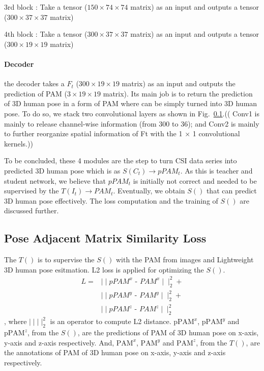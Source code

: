 \documentclass[conference]{IEEEtran}
\begin{document}
	 	3rd block : Take a tensor ($150\times74\times74$   matrix) as an input and outputs a tensor ($300\times37\times37$  matrix)
	 	
	 	4th block : Take a tensor ($300\times37\times37$   matrix) as an input and outputs a tensor ($300\times19\times19$  matrix)
	 	
	 	\paragraph{Decoder}
	 	
	 	the decoder takes a $F_t$ ($300\times19\times19$  matrix) as an input and outputs the prediction of PAM ($3\times19\times19$ matrix). Its main job is to return the prediction of 3D human pose in a form of PAM where can be simply turned into 3D human pose. To do so,	 we stack two convolutional layers as shown in Fig.~\ref{}.(( Conv1 is mainly to release channel-wise information (from 300 to 36); and Conv2 is
	 	mainly to further reorganize spatial information of Ft with the 1 × 1 convolutional kernels.))
	 	
	 	
	 	To be concluded, these 4 modules are the step to turn CSI data series into predicted 3D human pose which is as $S(C_t) \rightarrow pPAM_t$. As this is teacher and student network, we believe that $pPAM_t$ is initially not correct and needed to be supervised by the $T(I_t) \rightarrow PAM_t$. Eventually, we obtain $S()$ that can predict 3D human pose effectively. The loss computation and the training of $S()$ are discussed further.

	\subsection{Pose Adjacent Matrix Similarity Loss}
	 
	 The $T()$ is to supervise the $S()$ with the PAM from images and Lightweight 3D human pose esitmation. L2 loss is applied for optimizing the $S()$.
	 \begin{equation}
	 \begin{aligned}
	 L = & \mid \mid pPAM^x \text{ - } PAM^x \mid \mid^2_2 + \\
	  & \mid \mid  pPAM^y \text{ - } PAM^y \mid \mid^2_2 + \\
	  & \mid \mid pPAM^z \text{ - } PAM^z \mid \mid^2_2
	 \label{eq:L2}
	 \end{aligned}
	 \end{equation}, where $\mid \mid  \mid \mid^2_2$ is an operator to compute L2 distance. $\text{pPAM}^x$, $\text{pPAM}^y$ and $\text{pPAM}^z$, from the $S()$, are the predictions  of PAM of 3D human pose on x-axis, y-axis and z-axis respectively. And, $\text{PAM}^x$, $\text{PAM}^y$ and $\text{PAM}^z$, from the $T()$, are the annotations of PAM of 3D human pose on x-axis, y-axis and z-axis respectively.
	 
\end{document}
